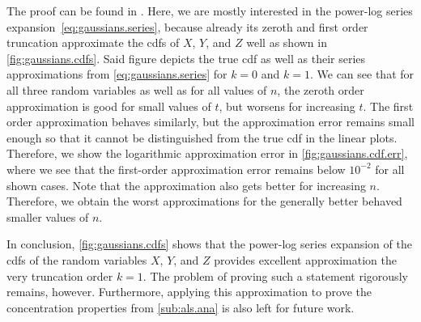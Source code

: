 The proof can be found in \cite{Stojanac}.
Here, we are mostly interested in the power-log series expansion~\eqref{eq:gaussians.series}, because already its zeroth and first order truncation approximate the cdfs of $X$, $Y$, and $Z$ well as shown in \cref{fig:gaussians.cdfs}.
Said figure depicts the true cdf as well as their series approximations from \cref{eq:gaussians.series} for $k=0$ and $k=1$.
We can see that for all three random variables as well as for all values of $n$, the zeroth order approximation is good for small values of $t$, but worsens for increasing $t$.
The first order approximation behaves similarly, but the approximation error remains small enough so that it cannot be distinguished from the true cdf in the linear plots.
Therefore, we show the logarithmic approximation error in \cref{fig:gaussians.cdf.err}, where we see that the first-order approximation error remains below $10^{-2}$ for all shown cases.
Note that the approximation also gets better for increasing $n$.
Therefore, we obtain the worst approximations for the generally better behaved smaller values of $n$.

In conclusion, \cref{fig:gaussians.cdfs} shows that the power-log series expansion of the cdfs of the random variables $X$, $Y$, and $Z$ provides excellent approximation the very truncation order $k=1$.
The problem of proving such a statement rigorously remains, however.
Furthermore, applying this approximation to prove the concentration properties from \cref{sub:als.ana} is also left for future work.\\



